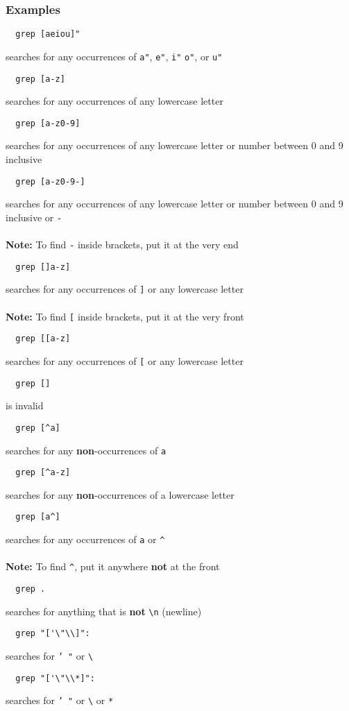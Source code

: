 \documentclass[13pt]{article}
\begin{document}
\subsubsection*{Examples}
\begin{verbatim}
  grep [aeiou]" \end{verbatim}
searches for any occurrences of \texttt{a"}, \texttt{e"}, \texttt{i"} \texttt{o"}, or \texttt{u"}
\begin{verbatim}
  grep [a-z] \end{verbatim}
searches for any occurrences of any lowercase letter
\begin{verbatim}
  grep [a-z0-9] \end{verbatim}
searches for any occurrences of any lowercase letter or number between 0 and 9 inclusive
\begin{verbatim}
  grep [a-z0-9-] \end{verbatim}
searches for any occurrences of any lowercase letter or number between 0 and 9 inclusive or \texttt{-} \\ \\
\textbf{Note:} To find \texttt{-} inside brackets, put it at the very end
\begin{verbatim}
  grep []a-z] \end{verbatim}
searches for any occurrences of \texttt{]} or any lowercase letter \\ \\
\textbf{Note:} To find \texttt{[} inside brackets, put it at the very front
\begin{verbatim}
  grep [[a-z] \end{verbatim}
searches for any occurrences of \texttt{[} or any lowercase letter
\begin{verbatim}
  grep [] \end{verbatim}
is invalid
\begin{verbatim}
  grep [^a] \end{verbatim}
searches for any \textbf{non}-occurrences of \texttt{a}
\begin{verbatim}
  grep [^a-z] \end{verbatim}
searches for any \textbf{non}-occurrences of a lowercase letter
\begin{verbatim}
  grep [a^] \end{verbatim}
searches for any occurrences of \texttt{a} or \texttt{\^} \\ \\
\textbf{Note:} To find \texttt{\^}, put it anywhere \textbf{not} at the front
\begin{verbatim}
  grep . \end{verbatim}
searches for anything that is \textbf{not} \texttt{\textbackslash n} (newline)
\begin{verbatim}
  grep "['\"\\]": \end{verbatim}
searches for \texttt{' "} or \texttt{\textbackslash}
\begin{verbatim}
  grep "['\"\\*]": \end{verbatim}
searches for \texttt{' "} or \texttt{\textbackslash} or \texttt{*}
\end{document}
